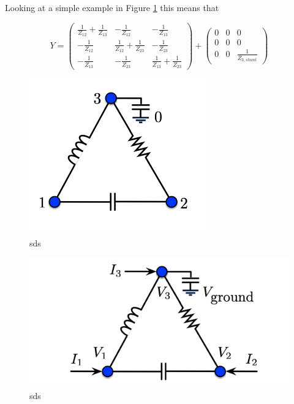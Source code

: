 \begin{example}Looking at a simple example in Figure \ref{fig:pn1} this means that 

\[Y=\begin{pmatrix}\frac{1}{Z_{12}}+\frac{1}{Z_{13}} & -\frac{1}{Z_{12}} & -\frac{1}{Z_{13}}\\
-\frac{1}{Z_{12}} & \frac{1}{Z_{12}}+\frac{1}{Z_{23}} & -\frac{1}{Z_{23}}\\
-\frac{1}{Z_{13}} & -\frac{1}{Z_{23}} & \frac{1}{Z_{13}}+\frac{1}{Z_{23}}\end{pmatrix}+\begin{pmatrix} 0 & 0 & 0\\0 & 0 &0\\ 0 & 0 & \frac{1}{Z_{3,shunt}}\end{pmatrix}
\]

\begin{figure}
\centering
\includegraphics[scale=1]{figs/pn1}
\caption{\label{fig:pn1}sds}
\end{figure}

\end{example}
\begin{figure}
\centering
\includegraphics[scale=1]{figs/pn2}
\caption{\label{fig:pn2}sds}
\end{figure}
